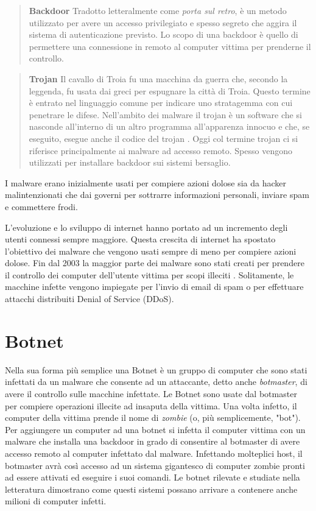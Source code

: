 \documentclass[../main.tex]{subfiles}
\begin{document}
\begin{verse}
				\textbf{Backdoor} Tradotto letteralmente come \textit{porta sul retro}, è un metodo utilizzato per avere un accesso privilegiato e spesso segreto che aggira il sistema di autenticazione previsto. Lo scopo di una backdoor è quello di permettere una connessione in remoto al computer vittima per prenderne il controllo.				
\end{verse}

\begin{verse}
				\textbf{Trojan} Il cavallo di Troia fu una macchina da guerra che, secondo la leggenda, fu usata dai greci per espugnare la città di Troia. Questo termine è entrato nel linguaggio comune per indicare uno stratagemma con cui penetrare le difese. Nell'ambito dei malware il trojan è un software che si nasconde all'interno di un altro programma all'apparenza innocuo e che, se eseguito, esegue anche il codice del trojan \cite{TrojanDef}.
				Oggi col termine trojan ci si riferisce principalmente ai malware ad accesso remoto. Spesso vengono utilizzati per installare backdoor sui sistemi bersaglio. \cite{TrojanPurpose}
\end{verse}

I malware erano inizialmente usati per compiere azioni dolose sia da hacker malintenzionati che dai governi per sottrarre informazioni personali, inviare spam e commettere frodi. \cite{ScopoMalware} \cite{MalwareRevolution}

L'evoluzione e lo sviluppo di internet hanno portato ad un incremento degli utenti connessi sempre maggiore. Questa crescita di internet ha spostato l'obiettivo dei malware che vengono usati sempre di meno per compiere azioni dolose. Fin dal 2003 la maggior parte dei malware sono stati creati per prendere il controllo dei computer dell'utente vittima per scopi illeciti \cite{MalwareRevolution}. Solitamente, le macchine infette vengono impiegate per l'invio di email di spam o per effettuare attacchi distribuiti Denial of Service (DDoS).


\section{Botnet}
Nella sua forma più semplice una Botnet è un gruppo di computer che sono stati infettati da un malware che consente ad un attaccante, detto anche \textit{botmaster}, di avere il controllo sulle macchine infettate. Le Botnet sono usate dal botmaster per compiere operazioni illecite ad insaputa della vittima. Una volta infetto, il computer della vittima prende il nome di \textit{zombie} (o, più semplicemente, "bot"). \cite{Botnet} \newline
Per aggiungere un computer ad una botnet si infetta il computer vittima con un malware che installa una backdoor in grado di consentire al botmaster di avere accesso remoto al computer infettato dal malware. Infettando molteplici host, il botmaster avrà così accesso ad un sistema gigantesco di computer zombie pronti ad essere attivati ed eseguire i suoi comandi. Le botnet rilevate e studiate nella letteratura dimostrano come questi sistemi possano arrivare a contenere anche milioni di computer infetti. \cite{Botnet}
\end{document}
